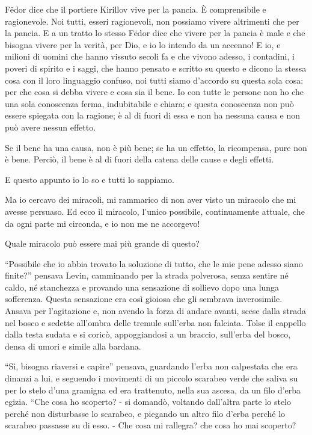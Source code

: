 Fëdor dice che il portiere Kirillov vive per la pancia. È comprensibile e ragionevole. Noi tutti, esseri ragionevoli, non possiamo vivere altrimenti che per la pancia. E a un tratto lo stesso Fëdor dice che vivere per la pancia è male e che bisogna vivere per la verità, per Dio, e io lo intendo da un accenno! E io, e milioni di uomini che hanno vissuto secoli fa e che vivono adesso, i contadini, i poveri di spirito e i saggi, che hanno pensato e scritto su questo e dicono la stessa cosa con il loro linguaggio confuso, noi tutti siamo d'accordo su questa sola cosa: per che cosa si debba vivere e cosa sia il bene. Io con tutte le persone non ho che una sola conoscenza ferma, indubitabile e chiara; e questa conoscenza non può essere spiegata con la ragione; è al di fuori di essa e non ha nessuna causa e non può avere nessun effetto. 

Se il bene ha una causa, non è più bene; se ha un effetto, la ricompensa, pure non è bene. Perciò, il bene è al di fuori della catena delle cause e degli effetti. 

E questo appunto io lo so e tutti lo sappiamo. 

Ma io cercavo dei miracoli, mi rammarico di non aver visto un miracolo che mi avesse persuaso. Ed ecco il miracolo, l'unico possibile, continuamente attuale, che da ogni parte mi circonda, e io non me ne accorgevo! 

Quale miracolo può essere mai più grande di questo? 

``Possibile che io abbia trovato la soluzione di tutto, che le mie pene adesso siano finite?'' pensava Levin, camminando per la strada polverosa, senza sentire né caldo, né stanchezza e provando una sensazione di sollievo dopo una lunga sofferenza. Questa sensazione era così gioiosa che gli sembrava inverosimile. Ansava per l'agitazione e, non avendo la forza di andare avanti, scese dalla strada nel bosco e sedette all'ombra delle tremule sull'erba non falciata. Tolse il cappello dalla testa sudata e si coricò, appoggiandosi a un braccio, sull'erba del bosco, densa di umori e simile alla bardana. 

``Sì, bisogna riaversi e capire'' pensava, guardando l'erba non calpestata che era dinanzi a lui, e seguendo i movimenti di un piccolo scarabeo verde che saliva su per lo stelo d'una gramigna ed era trattenuto, nella sua ascesa, da un filo d'erba egizia. ``Che cosa ho scoperto? - si domandò, voltando dall'altra parte lo stelo perché non disturbasse lo scarabeo, e piegando un altro filo d'erba perché lo scarabeo passasse su di esso. - Che cosa mi rallegra? che cosa ho mai scoperto? 

